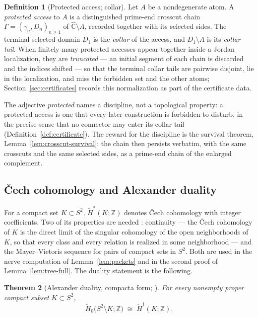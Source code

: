 \documentclass[11pt,reqno]{amsart}
\newtheorem{theorem}{Theorem}[section]
\theoremstyle{definition}
\newtheorem{definition}[theorem]{Definition}
\theoremstyle{remark}
\newcommand{\Z}{\mathbb Z}
\newcommand{\Chat}{\widehat{\mathbb C}}
\begin{document}
\begin{definition}[Protected access; collar]\label{def:A-protected}
Let $A$ be a nondegenerate atom.  A \emph{protected access} to $A$ is a
distinguished prime-end crosscut chain
$\Gamma=(\gamma_n,D_n)_{n\ge1}$ of $\Chat\setminus A$, recorded together
with its selected sides.  The terminal selected domain $D_1$ is the
\emph{collar} of the access, and $D_1\setminus A$ is its \emph{collar
tail}.  When finitely many protected accesses appear together inside a
Jordan localization, they are \emph{truncated} --- an initial segment of
each chain is discarded and the indices shifted --- so that the terminal
collar tails are pairwise disjoint, lie in the localization, and miss the
forbidden set and the other atoms; Section~\ref{sec:certificates} records
this normalization as part of the certificate data.
\end{definition}

The adjective \emph{protected} names a discipline, not a topological
property: a protected access is one that every later construction is
forbidden to disturb, in the precise sense that no connector may enter
its collar tail (Definition~\ref{def:certificate}).  The reward for the
discipline is the survival theorem, Lemma~\ref{lem:crosscut-survival}:
the chain then persists verbatim, with the same crosscuts and the same
selected sides, as a prime-end chain of the enlarged complement.

\subsection{\v{C}ech cohomology and Alexander duality}
\label{subsec:A-duality}

For a compact set $K\subset S^2$, $\check H^*(K;\Z)$ denotes \v{C}ech
cohomology with integer coefficients.  Two of its properties are needed
\cite{Hat02}: continuity --- the \v{C}ech cohomology of $K$ is the direct
limit of the singular cohomology of the open neighborhoods of $K$, so
that every class and every relation is realized in some neighborhood ---
and the Mayer--Vietoris sequence for pairs of compact sets in $S^2$.
Both are used in the nerve computation of Lemma~\ref{lem:packets} and in
the second proof of Lemma~\ref{lem:tree-full}.  The duality statement is
the following.

\begin{theorem}[Alexander duality, compacta form;
{\cite[pp.~256--257]{Hat02}}]\label{thm:A-duality}
For every nonempty proper compact subset $K\subset S^2$,
\begin{equation}\label{eq:A-duality}
\widetilde H_0\bigl(S^2\setminus K;\Z\bigr)\;\cong\;\check H^1(K;\Z).
\end{equation}
\end{theorem}
\end{document}
